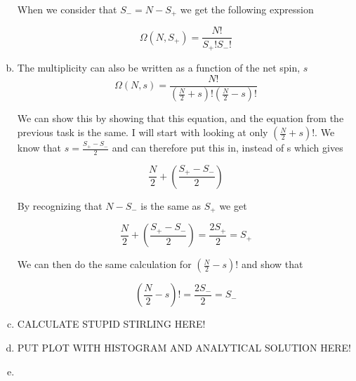\documentclass[a4paper,norsk,12pt,oneside]{article}
\begin{document}
\begin{enumerate}[a)]
        When we consider that \(S_- = N - S_+\) we get the following expression

        \begin{equation*}
            \Omega(N, S_+) = \frac{N!}{S_+!S_-!}
        \end{equation*}

    \item

        The multiplicity can also be written as a function of the net spin, \(s\)
        \begin{equation*}
            \Omega(N, s) = \frac{N!}{\left (\frac{N}{2} + s \right )! \left (\frac{N}{2} - s 
        \right )!} 
        \end{equation*}

        We can show this by showing that this equation, and the equation from the previous
        task is the same. 
        I will start with looking at only \(\left (\frac{N}{2} + s \right )!\). 
        We know that \(s = \frac{S_+ - S_-}{2}\) and can therefore put this in,
        instead of s which gives

        \begin{equation*}
            \frac{N}{2} + \left (\frac{S_+ - S_-}{2} \right ) 
        \end{equation*}

        By recognizing that \(N - S_-\) is the same as \(S_+\) we get

        \begin{equation*}
            \frac{N}{2} + \left (\frac{S_+ - S_-}{2} \right ) = \frac{2S_+}{2} = S_+
        \end{equation*}

        We can then do the same calculation for \( \left (\frac{N}{2} - s 
        \right )! \)  and show that

        \begin{equation*}
            \left (\frac{N}{2} - s \right )! = \frac{2S_-}{2} = S_-
        \end{equation*} 

    \item

        CALCULATE STUPID STIRLING HERE!

    \item 

        PUT PLOT WITH HISTOGRAM AND ANALYTICAL SOLUTION HERE!

    \item 


\end{enumerate}
\end{document}
